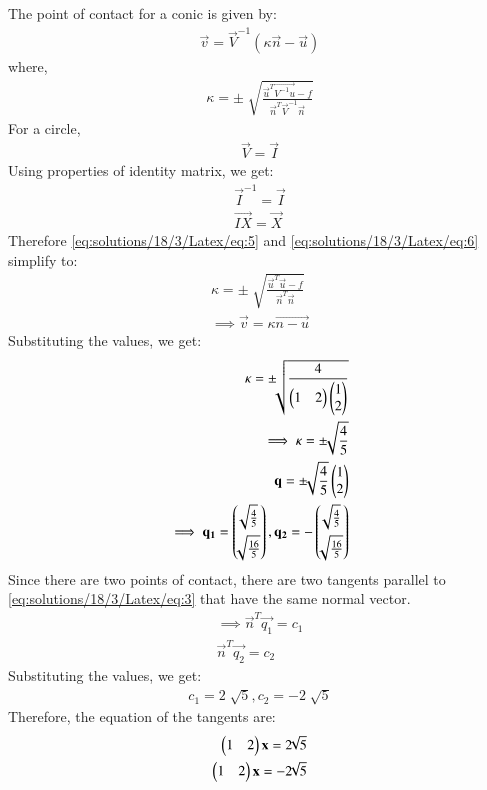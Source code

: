 The point of contact for a conic is given by:
\begin{align}
  \vec{v} = \vec{V}^{-1}(\kappa\vec{n}-\vec{u}) \label{eq:solutions/18/3/Latex/eq:5}
\end{align}
where,
\begin{align}
  \kappa = \pm \sqrt[]{\frac{\vec{u}^T\vec{V^{-1}u}-f}{\vec{n}^T\vec{V}^{-1}\vec{n}}} \label{eq:solutions/18/3/Latex/eq:6}
\end{align}
For a circle,
\begin{align}
  \vec{V} = \vec{I}
\end{align}
Using properties of identity matrix, we get:
\begin{align}
  \vec{I}^{-1} = \vec{I} \\
  \vec{IX} = \vec{X}
\end{align}
Therefore \eqref{eq:solutions/18/3/Latex/eq:5} and \eqref{eq:solutions/18/3/Latex/eq:6} simplify to:
\begin{align}
  \kappa = \pm \sqrt[]{\frac{\vec{u}^T\vec{u}-f}{\vec{n}^T\vec{n}}} \\
  \implies \vec{v} = \kappa\vec{n-u}
\end{align}
Substituting the values, we get:
\begin{align}
  \kappa = \pm \sqrt[]{\frac{4}{\begin{pmatrix}1 & 2\end{pmatrix}\begin{pmatrix}1 \\ 2\end{pmatrix}}} \\
  \implies \kappa = \pm \sqrt[]{\frac{4}{5}} \\
  \mathbf{q} = \pm \sqrt[]{\frac{4}{5}}\begin{pmatrix}1 \\ 2\end{pmatrix} \\
  \implies \mathbf{q_1} = \begin{pmatrix}\sqrt[]{\frac{4}{5}} \\[0.2cm] \sqrt[]{\frac{16}{5}}\end{pmatrix}, \mathbf{q_2} = -\begin{pmatrix}\sqrt[]{\frac{4}{5}} \\[0.2cm] \sqrt[]{\frac{16}{5}}\end{pmatrix}
\end{align}
Since there are two points of contact, there are two tangents parallel to \eqref{eq:solutions/18/3/Latex/eq:3} that have the same normal vector.
\begin{align}
  \implies \vec{n}^T\vec{q_1} = c_1 \\
  \vec{n}^T\vec{q_2} = c_2
\end{align}
Substituting the values, we get:
\begin{align}
  c_1 = 2\sqrt[]{5}, c_2 = -2\sqrt[]{5}
\end{align}
Therefore, the equation of the tangents are:
\begin{align}
  \begin{pmatrix}1 & 2\end{pmatrix}\mathbf{x} = 2\sqrt[]{5} \\
  \begin{pmatrix}1 & 2\end{pmatrix}\mathbf{x} = -2\sqrt[]{5}
\end{align}
